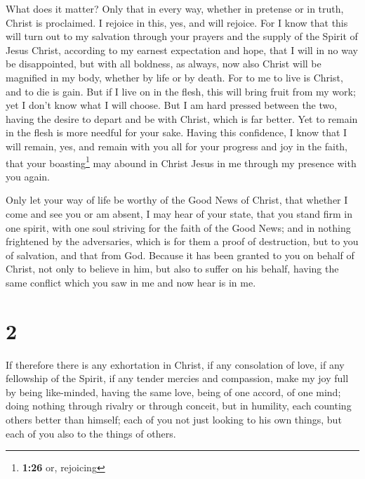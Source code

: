  What does it matter? Only that in every way, whether in
pretense or in truth, Christ is proclaimed. I rejoice in this, yes, and
will rejoice.  For I know that this will turn out to my
salvation through your prayers and the supply of the Spirit of Jesus
Christ,  according to my earnest expectation and hope,
that I will in no way be disappointed, but with all boldness, as always,
now also Christ will be magnified in my body, whether by life or by
death.  For to me to live is Christ, and to die is gain.
 But if I live on in the flesh, this will bring fruit
from my work; yet I don't know what I will choose.  But I
am hard pressed between the two, having the desire to depart and be with
Christ, which is far better.  Yet to remain in the flesh
is more needful for your sake.  Having this confidence, I
know that I will remain, yes, and remain with you all for your progress
and joy in the faith,  that your boasting\footnote{\textbf{1:26}
  or, rejoicing} may abound in Christ Jesus in me through my presence
with you again.

 Only let your way of life be worthy of the Good News of
Christ, that whether I come and see you or am absent, I may hear of your
state, that you stand firm in one spirit, with one soul striving for the
faith of the Good News;  and in nothing frightened by the
adversaries, which is for them a proof of destruction, but to you of
salvation, and that from God.  Because it has been
granted to you on behalf of Christ, not only to believe in him, but also
to suffer on his behalf,  having the same conflict which
you saw in me and now hear is in me.

\hypertarget{section-1}{%
\section{2}\label{section-1}}

 If therefore there is any exhortation in Christ, if any
consolation of love, if any fellowship of the Spirit, if any tender
mercies and compassion,  make my joy full by being
like-minded, having the same love, being of one accord, of one mind;
 doing nothing through rivalry or through conceit, but in
humility, each counting others better than himself;  each
of you not just looking to his own things, but each of you also to the
things of others.

